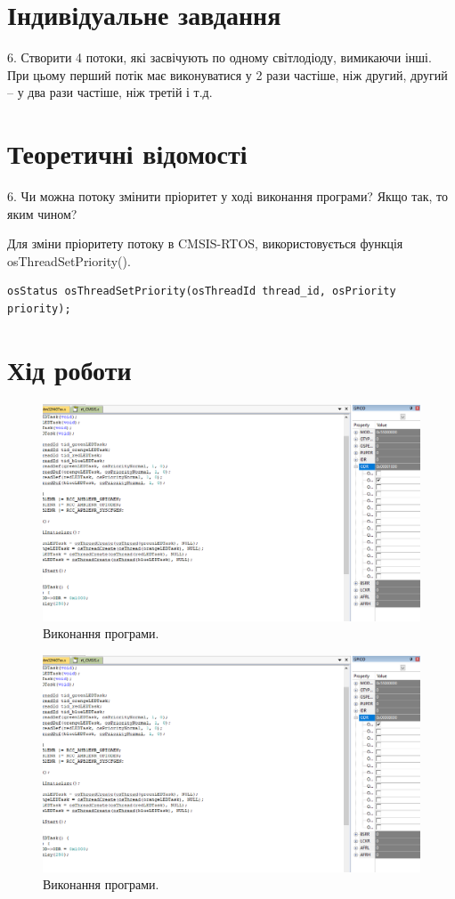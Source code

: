 \documentclass[oneside,14pt]{extarticle}
\begin{document}
\begin{normalsize}
	\section*{Індивідуальне завдання}
	6. Створити 4 потоки, які засвічують по одному світлодіоду, вимикаючи інші. При цьому перший потік має виконуватися у 2 рази частіше, ніж другий, другий – у два рази частіше, ніж третій і т.д.

	\section*{Теоретичні відомості}
	6. Чи можна потоку змінити пріоритет у ході виконання програми? Якщо так, то яким чином?
	
	Для зміни пріоритету потоку в CMSIS-RTOS, використовується функція osThreadSetPriority().
	
	\begin{lstlisting}
osStatus osThreadSetPriority(osThreadId thread_id, osPriority priority);\end{lstlisting}
	
	\section*{Хід роботи}
	\begin{figure}[H]
		\centering
		\includegraphics[scale=0.45]{1}
		\caption{Виконання програми.}
	\end{figure}

	\begin{figure}[H]
		\centering
		\includegraphics[scale=0.45]{2}
		\caption{Виконання програми.}
	\end{figure}
	

\end{normalsize}
\end{document}
